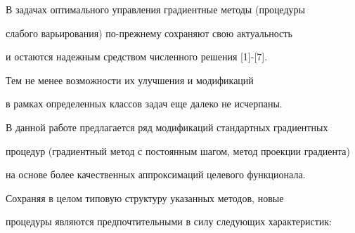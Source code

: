 

\maketitle


\label{begin}








В задачах оптимального управления градиентные методы (процедуры


слабого варьирования) по-прежнему сохраняют свою актуальность


и остаются надежным средством численного решения [1]-[7].


Тем не менее возможности их улучшения и модификаций 


в рамках определенных классов задач еще далеко не исчерпаны.





В данной работе предлагается ряд модификаций стандартных градиентных 


процедур (градиентный метод с постоянным шагом, метод проекции градиента)


на основе более качественных аппроксимаций целевого функционала.


Сохраняя в целом типовую структуру указанных методов, новые 


процедуры являются предпочтительными в силу следующих характеристик:


